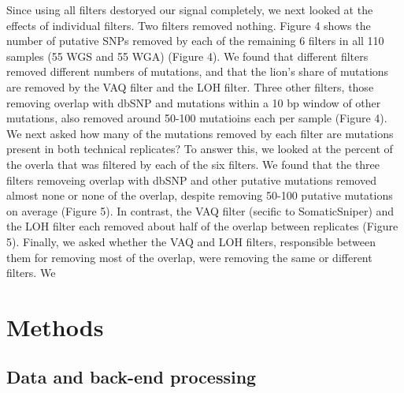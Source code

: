 \documentclass[11pt]{article} %
\begin{document}
Since using all filters destoryed our signal completely, we next looked at the effects of individual filters. Two filters removed nothing. Figure 4 shows the number of putative SNPs removed by each of the remaining 6 filters in all 110 samples (55 WGS and 55 WGA) (Figure 4). We found that different filters removed different numbers of mutations, and that the lion's share of mutations are removed by the VAQ filter and the LOH filter. Three other filters, those removing overlap with dbSNP and mutations within a 10 bp window of other mutations, also removed around 50-100 mutatioins each per sample (Figure 4). We next asked how many of the mutations removed by each filter are mutations present in both technical replicates? To answer this, we looked at the percent of the overla that was filtered by each of the six filters. We found that the three filters removeing overlap with dbSNP and other putative mutations removed almost none or none of the overlap, despite removing 50-100 putative mutations on average (Figure 5). In contrast, the VAQ filter (secific to SomaticSniper) and the LOH filter each removed about half of the overlap between replicates (Figure 5). Finally, we asked whether the VAQ and LOH filters, responsible between them for removing most of the overlap, were removing the same or different filters. We 


\section{Methods}

\subsection{Data and back-end processing}
\end{document}
